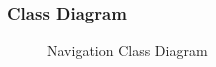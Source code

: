 \subsubsection{Class Diagram}
	\begin{figure}[h!]
	\caption{Navigation Class Diagram}
	\end{figure}

